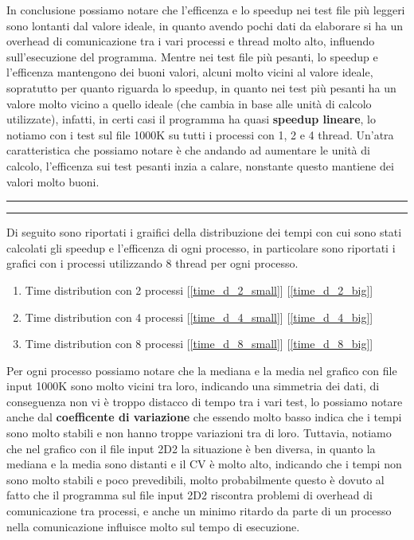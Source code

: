 \documentclass{article}
\begin{document}
  In conclusione possiamo notare che l'efficenza e lo speedup nei test file più leggeri sono lontanti dal valore ideale, in quanto avendo pochi dati da elaborare si ha un overhead di comunicazione tra i vari processi e thread molto alto, influendo sull'esecuzione del programma. 
  Mentre nei test file più pesanti, lo speedup e l'efficenza mantengono dei buoni valori, alcuni molto vicini al valore ideale, sopratutto per quanto riguarda lo speedup, in quanto nei test più pesanti ha un valore molto vicino a quello ideale (che cambia in 
  base alle unità di calcolo utilizzate), infatti, in certi casi il programma ha quasi \textbf{speedup lineare}, lo notiamo con i test sul file 1000K su tutti i processi con 1, 2 e 4 thread. Un'atra caratteristica che possiamo notare è che andando ad aumentare le unità di calcolo, l'efficenza sui test pesanti 
  inzia a calare, nonstante questo mantiene dei valori molto buoni.

  \begin{center}
    \rule{2.5cm}{1pt}  \rule{2.5cm}{1pt}
  \end{center}

  Di seguito sono riportati i graifici della distribuzione dei tempi con cui sono stati calcolati gli speedup e l'efficenza di ogni processo, in particolare sono riportati i grafici 
  con i processi utilizzando 8 thread per ogni processo.
  \begin{enumerate}
    \item Time distribution con 2 processi [\ref{time_d_2_small}] [\ref{time_d_2_big}]
    \item Time distribution con 4 processi [\ref{time_d_4_small}] [\ref{time_d_4_big}]
    \item Time distribution con 8 processi [\ref{time_d_8_small}] [\ref{time_d_8_big}]
  \end{enumerate}

  Per ogni processo possiamo notare che la mediana e la media nel grafico con file input 1000K sono molto vicini tra loro, indicando una simmetria dei dati, di conseguenza non vi è troppo distacco 
  di tempo tra i vari test, lo possiamo notare anche dal \textbf{coefficente di variazione} che essendo molto basso indica che i tempi sono molto stabili 
  e non hanno troppe variazioni tra di loro. Tuttavia, notiamo che nel grafico con il file input 2D2 la situazione è ben diversa, in quanto la mediana 
  e la media sono distanti e il CV è molto alto, indicando che i tempi non sono molto stabili e poco prevedibili, molto probabilmente
  questo è dovuto al fatto che il programma sul file input 2D2 riscontra problemi di overhead di comunicazione tra processi, e anche un minimo ritardo da parte di 
  un processo nella comunicazione influisce molto sul tempo di esecuzione.
\end{document}
